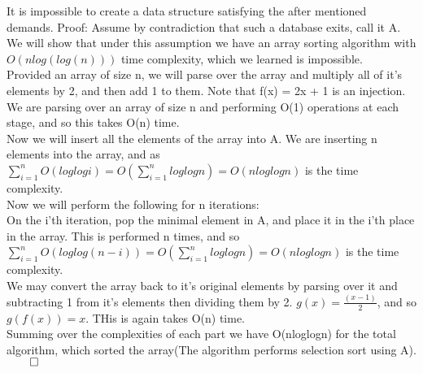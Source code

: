 \documentclass{article}
\begin{document}
It is impossible to create a data structure satisfying the after mentioned demands. Proof:
Assume by contradiction that such a database exits, call it A. We will show that under this assumption we have an array sorting algorithm with $O(nlog(log(n)))$ time complexity, which we learned is impossible.\\
Provided an array of size n, we will parse over the array and multiply 
all of it's elements by 2, and then add 1 to them. Note that
f(x) = 2x + 1 is an injection. We are parsing over an array of size n and performing O(1) operations at each stage, and
so this takes O(n) time.\\
Now we will insert all the elements of the array into A. We are inserting n elements into the array, and as $\sum_{i=1}^{n}O(loglogi) = O(\sum_{i=1}^{n}loglogn) = O(nloglogn)$
is the time complexity.\\
Now we will perform the following for n iterations:\\
On the i'th iteration, pop the minimal element in A, and place it in the i'th place in the array. This is performed n times, and so
$\sum_{i=1}^{n}O(loglog(n-i)) = O(\sum_{i=1}^{n}loglogn) = O(nloglogn)$
is the time complexity.\\
We may convert the array back to it's original elements by parsing over it and subtracting 1 from it's elements then dividing them by 2. $g(x) = \frac{(x-1)}{2}$,  and so $g(f(x)) = x$. THis is again takes O(n) time.\\
Summing over the complexities of each part we have O(nloglogn) for the total algorithm, which sorted the array(The algorithm performs selection sort using A). $\qed$
\end{document}
